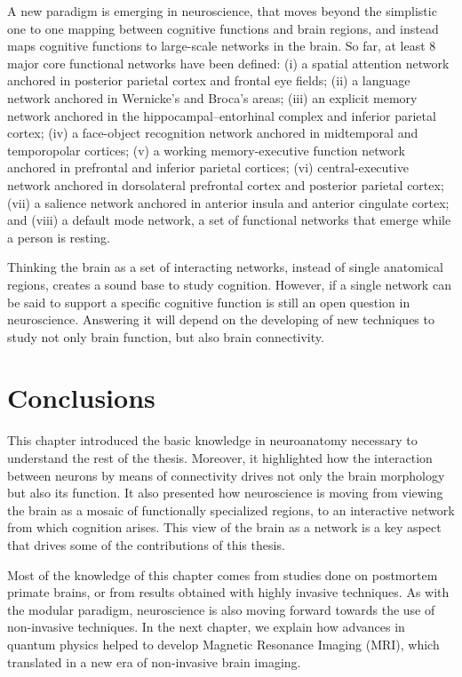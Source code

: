 A new paradigm is emerging in neuroscience, that moves beyond the simplistic
one to one mapping between cognitive functions and brain regions, and instead
maps cognitive functions to large-scale networks in the brain. So far, at least
8 major core functional networks have been defined\cite{Bressler2010}:
(i) a spatial attention network anchored in posterior parietal cortex and frontal eye fields;
(ii) a language network anchored in Wernicke’s and Broca’s areas;
(iii) an explicit memory network anchored in the hippocampal–entorhinal 
complex and inferior parietal cortex; (iv) a face-object recognition
network anchored in midtemporal and temporopolar cortices; (v) a
working memory-executive function network anchored in prefrontal and
inferior parietal cortices; (vi) central-executive network anchored in
dorsolateral prefrontal cortex and posterior parietal cortex; (vii) a salience
network anchored in anterior insula and anterior cingulate cortex; and (viii)
a default mode network, a set of functional networks that emerge while a person
is resting.

Thinking the brain as a set of interacting networks, instead of single anatomical
regions, creates a sound base to study cognition\cite{Bressler2010}. However,
if a single network can be said to support a specific cognitive function is 
still an open question in neuroscience. Answering it will depend on the 
developing of new techniques to study not only brain function, but also brain
connectivity.

\section{Conclusions}
This chapter introduced the basic knowledge in neuroanatomy necessary to
understand the rest of the thesis. Moreover, it highlighted  how the interaction
between neurons by means of connectivity drives not only the brain morphology
but also its function. It also presented how neuroscience is moving from
viewing the brain as a mosaic of functionally specialized regions, to an
interactive network from which cognition arises. This view of the brain as 
a network is a key aspect that drives some of the contributions of this thesis.

Most of the knowledge of this chapter comes from studies done on 
postmortem primate brains, or from results obtained with highly invasive
techniques. As with the modular paradigm, neuroscience is also moving forward
towards the use of non-invasive techniques. In the next chapter, we explain how 
advances in quantum physics helped to develop Magnetic Resonance Imaging (MRI),
which translated in a new era of non-invasive brain imaging.

\chapterbib
